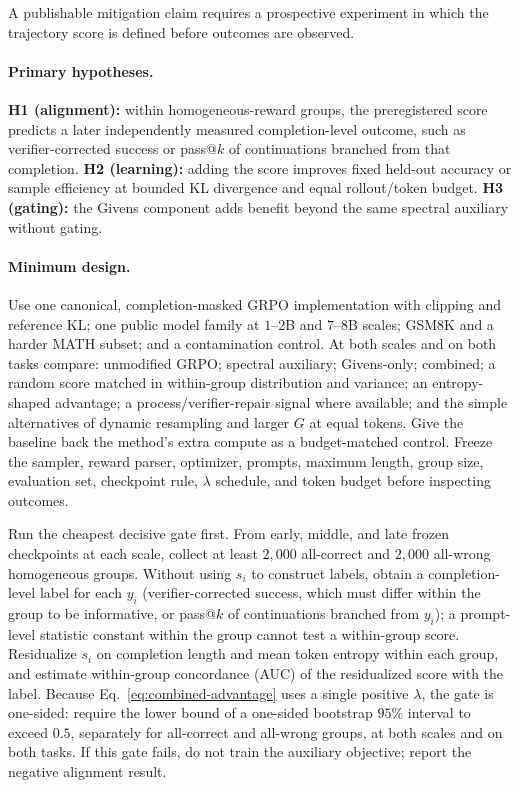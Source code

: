 \documentclass{article}
\begin{document}
A publishable mitigation claim requires a prospective experiment in which the
trajectory score is defined before outcomes are observed.

\paragraph{Primary hypotheses.}
\textbf{H1 (alignment):} within homogeneous-reward groups, the preregistered
score predicts a later independently measured completion-level outcome, such
as verifier-corrected success or pass@$k$ of continuations branched from that
completion.
\textbf{H2 (learning):} adding the score improves fixed held-out accuracy or
sample efficiency at bounded KL divergence and equal rollout/token budget.
\textbf{H3 (gating):} the Givens component adds benefit beyond the same
spectral auxiliary without gating.

\paragraph{Minimum design.}
Use one canonical, completion-masked GRPO implementation with clipping and
reference KL; one public model family at $1$--$2$B and $7$--$8$B scales; GSM8K
and a harder MATH subset; and a contamination control.  At both scales and on
both tasks compare: unmodified GRPO; spectral auxiliary; Givens-only; combined;
a random score matched in within-group distribution and variance; an
entropy-shaped advantage; a process/verifier-repair signal where available;
and the simple alternatives of dynamic resampling and larger $G$ at equal
tokens.  Give the baseline back the method's extra compute as a budget-matched
control.  Freeze the sampler, reward parser, optimizer, prompts, maximum
length, group size, evaluation set, checkpoint rule, $\lambda$ schedule, and
token budget before inspecting outcomes.

Run the cheapest decisive gate first.  From early, middle, and late frozen
checkpoints at each scale, collect at least $2{,}000$ all-correct and $2{,}000$
all-wrong homogeneous groups.  Without using $s_i$ to construct labels, obtain
a completion-level label for each $y_i$ (verifier-corrected success, which must
differ within the group to be informative, or pass@$k$ of continuations
branched from $y_i$); a prompt-level statistic constant within the group cannot
test a within-group score.  Residualize $s_i$ on completion length and mean
token entropy within each group, and estimate within-group concordance (AUC) of
the residualized score with the label.  Because Eq.~\eqref{eq:combined-advantage}
uses a single positive $\lambda$, the gate is one-sided: require the lower
bound of a one-sided bootstrap $95\%$ interval to exceed $0.5$, separately for
all-correct and all-wrong groups, at both scales and on both tasks.  If this
gate fails, do not train the auxiliary objective; report the negative alignment
result.
\end{document}
